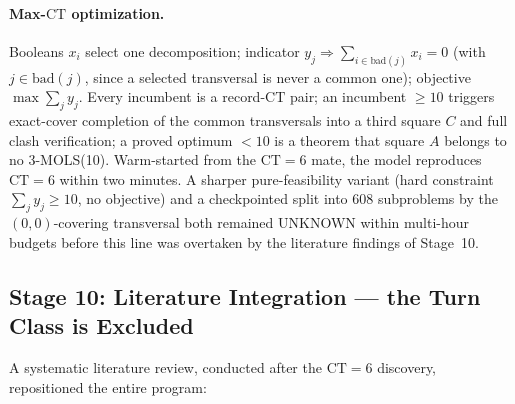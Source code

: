 \documentclass[11pt,a4paper]{article}
\theoremstyle{remark}
\newcommand{\CT}{\mathrm{CT}}
\begin{document}
\paragraph{Max-$\CT$ optimization.} Booleans $x_i$ select one decomposition;
indicator $y_j \Rightarrow \sum_{i \in \mathrm{bad}(j)} x_i = 0$ (with
$j \in \mathrm{bad}(j)$, since a selected transversal is never a common one);
objective $\max \sum_j y_j$. Every incumbent is a record-$\CT$ pair; an
incumbent $\geq 10$ triggers exact-cover completion of the common transversals
into a third square $C$ and full clash verification; a proved optimum $< 10$
is a theorem that square $A$ belongs to no 3-MOLS(10). Warm-started from the
$\CT=6$ mate, the model reproduces $\CT = 6$ within two minutes. A sharper
pure-feasibility variant (hard constraint $\sum_j y_j \geq 10$, no objective)
and a checkpointed split into 608 subproblems by the $(0,0)$-covering
transversal both remained UNKNOWN within multi-hour budgets before this
line was overtaken by the literature findings of Stage~10.

\subsection{Stage 10: Literature Integration --- the Turn Class is Excluded}
\label{sec:stage10}

A systematic literature review, conducted after the $\CT=6$ discovery,
repositioned the entire program:
\end{document}
